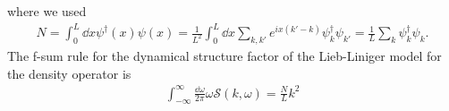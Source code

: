 \documentclass[11pt, a4paper]{report} %
\begin{document}
where we used 
\begin{align}
  \label{eq:6}
  N = \int_0^{L} \dd x \psi^{\dagger}(x) \psi(x)
    = \frac{1}{L^2} \int_{0}^L \dd x \sum_{k,k'} e^{ix(k'-k)} \psi_k^{\dag} \psi_{k'}
    = \frac{1}{L} \sum_k \psi^{\dag}_k \psi_k .
\end{align}
The f-sum rule for the dynamical structure factor of the Lieb-Liniger model for the density operator is
\begin{align}
  \label{eq:16}
  \int_{-\infty}^{\infty} \frac{\dd \omega}{2\pi} \omega \mathcal{S}(k, \omega) = \frac{N}{L}k^2
\end{align}




\end{document}
